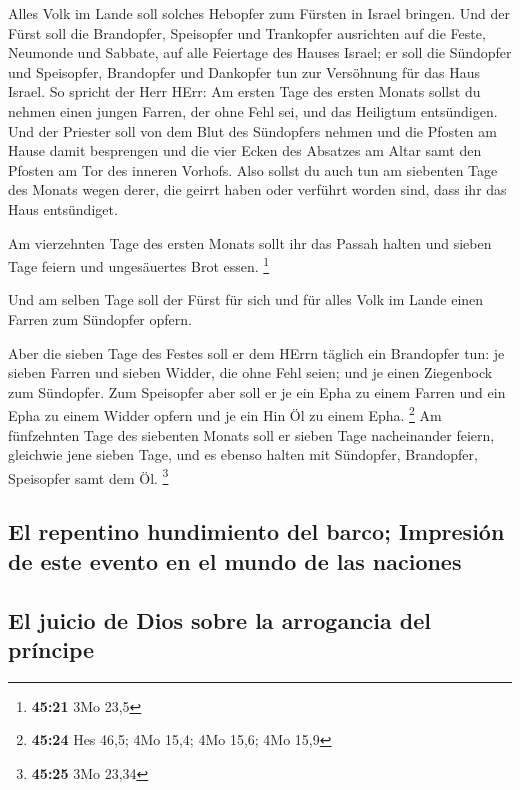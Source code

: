  Alles Volk im Lande soll solches Hebopfer zum Fürsten in
Israel bringen.  Und der Fürst soll die Brandopfer,
Speisopfer und Trankopfer ausrichten auf die Feste, Neumonde und
Sabbate, auf alle Feiertage des Hauses Israel; er soll die Sündopfer und
Speisopfer, Brandopfer und Dankopfer tun zur Versöhnung für das Haus
Israel.  So spricht der Herr HErr: Am ersten Tage des
ersten Monats sollst du nehmen einen jungen Farren, der ohne Fehl sei,
und das Heiligtum entsündigen.  Und der Priester soll von
dem Blut des Sündopfers nehmen und die Pfosten am Hause damit besprengen
und die vier Ecken des Absatzes am Altar samt den Pfosten am Tor des
inneren Vorhofs.  Also sollst du auch tun am siebenten
Tage des Monats wegen derer, die geirrt haben oder verführt worden sind,
dass ihr das Haus entsündiget.

 Am vierzehnten Tage des ersten Monats sollt ihr das
Passah halten und sieben Tage feiern und ungesäuertes Brot essen.
\footnote{\textbf{45:21} 3Mo 23,5}

 Und am selben Tage soll der Fürst für sich und für alles
Volk im Lande einen Farren zum Sündopfer opfern.

 Aber die sieben Tage des Festes soll er dem HErrn
täglich ein Brandopfer tun: je sieben Farren und sieben Widder, die ohne
Fehl seien; und je einen Ziegenbock zum Sündopfer.  Zum
Speisopfer aber soll er je ein Epha zu einem Farren und ein Epha zu
einem Widder opfern und je ein Hin Öl zu einem Epha. \footnote{\textbf{45:24}
  Hes 46,5; 4Mo 15,4; 4Mo 15,6; 4Mo 15,9}  Am fünfzehnten
Tage des siebenten Monats soll er sieben Tage nacheinander feiern,
gleichwie jene sieben Tage, und es ebenso halten mit Sündopfer,
Brandopfer, Speisopfer samt dem Öl. \footnote{\textbf{45:25} 3Mo 23,34}

\hypertarget{el-repentino-hundimiento-del-barco-impresiuxf3n-de-este-evento-en-el-mundo-de-las-naciones}{%
\subsection{El repentino hundimiento del barco; Impresión de este evento
en el mundo de las
naciones}\label{el-repentino-hundimiento-del-barco-impresiuxf3n-de-este-evento-en-el-mundo-de-las-naciones}}

\hypertarget{el-juicio-de-dios-sobre-la-arrogancia-del-pruxedncipe}{%
\subsection{El juicio de Dios sobre la arrogancia del
príncipe}\label{el-juicio-de-dios-sobre-la-arrogancia-del-pruxedncipe}}

